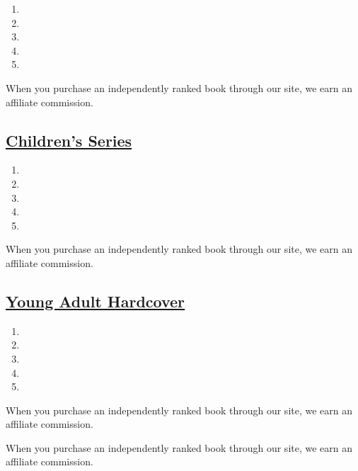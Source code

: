 \begin{enumerate}
\def\labelenumi{\arabic{enumi}.}
\tightlist
\item
\item
\item
\item
\item
\end{enumerate}

When you purchase an independently ranked book through our site, we earn
an affiliate commission.

\hypertarget{childrens-series}{%
\subsection{\texorpdfstring{\href{/books/best-sellers/series-books/}{Children's
Series}}{Children's Series}}\label{childrens-series}}

\begin{enumerate}
\def\labelenumi{\arabic{enumi}.}
\tightlist
\item
\item
\item
\item
\item
\end{enumerate}

When you purchase an independently ranked book through our site, we earn
an affiliate commission.

\hypertarget{young-adult-hardcover}{%
\subsection{\texorpdfstring{\href{/books/best-sellers/young-adult-hardcover/}{Young
Adult Hardcover}}{Young Adult Hardcover}}\label{young-adult-hardcover}}

\begin{enumerate}
\def\labelenumi{\arabic{enumi}.}
\tightlist
\item
\item
\item
\item
\item
\end{enumerate}

When you purchase an independently ranked book through our site, we earn
an affiliate commission.

When you purchase an independently ranked book through our site, we earn
an affiliate commission.

